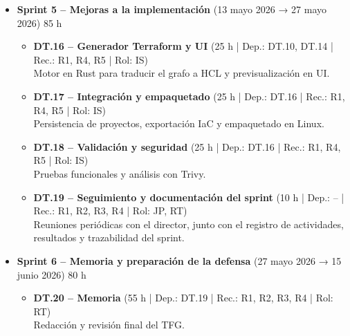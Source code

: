 \documentclass{article}
\begin{document}
{\begin{itemize}[leftmargin=*, itemsep=2pt]
\begin{itemize}[leftmargin=1.2em, itemsep=2pt]
            \end{itemize}
        

            \item \textbf{Sprint 5 – Mejoras a la implementación} 
            (13 mayo 2026 → 27 mayo 2026) 85 h
            
            \begin{itemize}[leftmargin=1.2em, itemsep=2pt]
            
                \item \textbf{DT.16 – Generador Terraform y UI} 
                (25 h | Dep.: DT.10, DT.14 | Rec.: R1, R4, R5 | Rol: IS) \\
                Motor en Rust para traducir el grafo a HCL y previsualización en UI.
            
                \item \textbf{DT.17 – Integración y empaquetado} 
                (25 h | Dep.: DT.16 | Rec.: R1, R4, R5 | Rol: IS) \\
                Persistencia de proyectos, exportación IaC y empaquetado en Linux.
            
                \item \textbf{DT.18 – Validación y seguridad} 
                (25 h | Dep.: DT.16 | Rec.: R1, R4, R5 | Rol: IS) \\
                Pruebas funcionales y análisis con Trivy.
            
                \item \textbf{DT.19 – Seguimiento y documentación del sprint} 
                (10 h | Dep.: -- | Rec.: R1, R2, R3, R4 | Rol: JP, RT) \\
                Reuniones periódicas con el director, junto con el registro de 
                actividades, resultados y trazabilidad del sprint.
            
            \end{itemize}

               \item \textbf{Sprint 6 – Memoria y preparación de la defensa} 
                (27 mayo 2026 → 15 junio 2026) 80 h
                \begin{itemize}[leftmargin=1.2em, itemsep=2pt]
                
                    \item \textbf{DT.20 – Memoria} 
                    (55 h | Dep.: DT.19 | Rec.: R1, R2, R3, R4 | Rol: RT) \\
                    Redacción y revisión final del TFG.
                

\end{itemize}
\end{itemize}}
\end{document}
